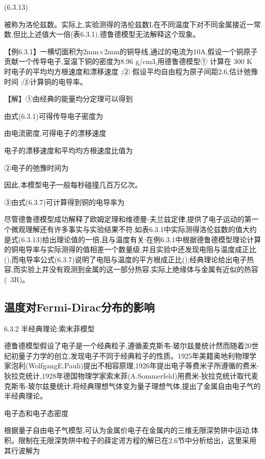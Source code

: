 	(6.3.13)

被称为洛伦兹数。实际上,实验测得的洛伦兹数L在不同温度下对不同金属接近一常数,但比上述值大一倍(表6.3.1),德鲁德模型无法解释这个现象。





【例6.3.1】一横切面积为2mm×2mm的铜导线,通过的电流为10A,假设一个铜原子贡献一个传导电子,室温下铜的密度为8.96 g/cm3,用德鲁德模型① 计算在 300 K 时电子的平均均方根速度和漂移速度 ;② 假设平均自由程为原子间距2.6,估计弛豫时间 ;③计算铜的电导率。

【解】①由经典的能量均分定理可以得到



由式(6.3.1)可得传导电子密度为



由电流密度,可得电子的漂移速度



电子的漂移速度和平均均方根速度比值为



②电子的弛豫时间为



因此,本模型电子一般每秒碰撞几百万亿次。

③由式(6.3.7)可计算得到铜的电导率为



尽管德鲁德模型成功解释了欧姆定理和维德曼-夫兰兹定律,提供了电子运动的第一个微观理解还有许多事实与实验结果不符,如表6.3.1中实际测得洛伦兹数的值大约是式(6.3.13)给出理论值的一倍,且与温度有关:在例6.3.1中根据德鲁德模型理论计算的铜电导率与实际测得的值相差一个数量级,并且实验中还发现电阻与温度成正比(),而电导率公式(6.3.7)说明了电阻与温度的平方根成正比();经典理论给出电子热容,而实验上并没有观测到金属的这一部分热容,实际上绝缘体与金属有近似的热容(~3R)。


\subsection{温度对Fermi-Dirac分布的影响}
6.3.2 半经典理论:索末菲模型

德鲁德模型假设了电子是一个经典粒子,遵循麦克斯韦-玻尔兹曼统计然而随着20世纪初量子力学的创立,发现电子不同于经典粒子的性质。1925年美籍奥地利物理学家泡利(WolfgangE.Pauli)提出不相容原理,1926年提出电子等费米子所遵循的费米-狄拉克统计,1928年德国物理学家索末菲(A.Sommerfeld)用费米-狄拉克统计取代麦克斯韦-玻尔兹曼统计,将经典理想气体变为量子理想气体,提出了金属自由电子气的半经典理论。

电子态和电子态密度

根据量子自由电子气模型,可认为金属价电子在金属内的三维无限深势阱中运动,体积。限制在无限深势阱中粒子的薛定谔方程的解已在2.6节中分析给出，这里采用其行波解为

